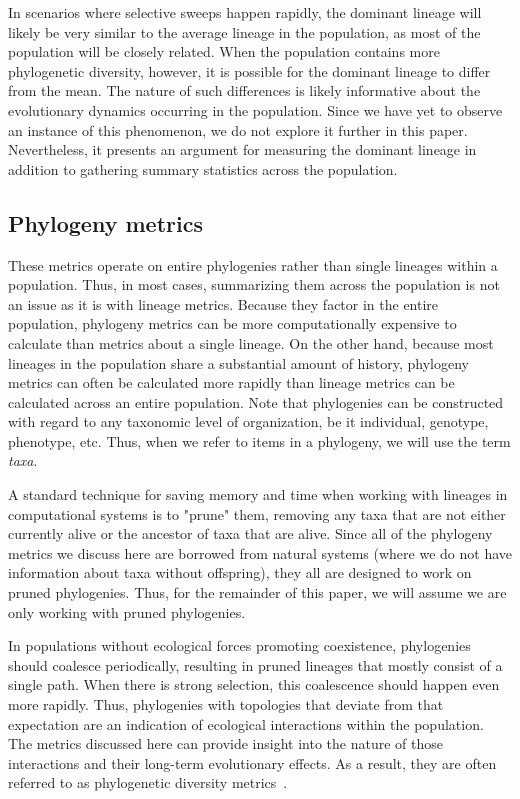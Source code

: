 \documentclass[letterpaper]{article}
\begin{document}
In scenarios where selective sweeps happen rapidly, the dominant lineage will likely be very similar to the average lineage in the population, as most of the population will be closely related. When the population contains more phylogenetic diversity, however, it is possible for the dominant lineage to differ from the mean. The nature of such differences is likely informative about the evolutionary dynamics occurring in the population. Since we have yet to observe an instance of this phenomenon, we do not explore it further in this paper. Nevertheless, it presents an argument for measuring the dominant lineage in addition to gathering summary statistics across the population.


\subsection{Phylogeny metrics}

These metrics operate on entire phylogenies rather than single lineages within a population. Thus, in most cases, summarizing them across the population is not an issue as it is with lineage metrics. Because they factor in the entire population, phylogeny metrics can be more computationally expensive to calculate than metrics about a single lineage. On the other hand, because most lineages in the population share a substantial amount of history, phylogeny metrics can often be calculated more rapidly than lineage metrics can be calculated across an entire population. Note that phylogenies can be constructed with regard to any taxonomic level of organization, be it individual, genotype, phenotype, etc. Thus, when we refer to items in a phylogeny, we will use the term \textit{taxa}.

A standard technique for saving memory and time when working with lineages in computational systems is to "prune" them, removing any taxa that are not either currently alive or the ancestor of taxa that are alive. Since all of the phylogeny metrics we discuss here are borrowed from natural systems (where we do not have information about taxa without offspring), they all are designed to work on pruned phylogenies. Thus, for the remainder of this paper, we will assume we are only working with pruned phylogenies.

In populations without ecological forces promoting coexistence, phylogenies should coalesce periodically, resulting in pruned lineages that mostly consist of a single path. When there is strong selection, this coalescence should happen even more rapidly. Thus, phylogenies with topologies that deviate from that expectation are an indication of ecological interactions within the population. The metrics discussed here can provide insight into the nature of those interactions and their long-term evolutionary effects. As a result, they are often referred to as phylogenetic diversity metrics~\citep{tucker_guide_2017}.
\end{document}
